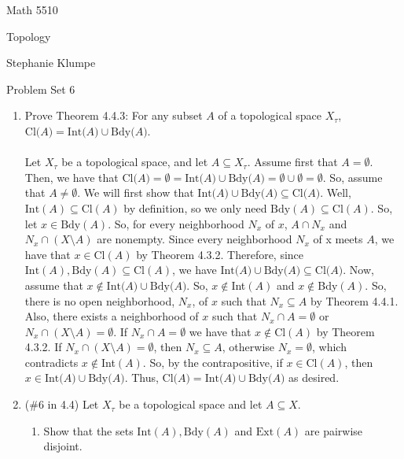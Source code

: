\documentclass[12pt]{article}
\begin{document}
\noindent Math 5510

\noindent Topology

\noindent Stephanie Klumpe

\vspace{.2in}
\begin{center}
Problem Set 6
\end{center}

 \begin{enumerate}%
\item Prove Theorem 4.4.3: For any subset $A$ of a topological space $X_{\tau}$,\\ $\text{Cl($A$)}=\text{Int($A$)}\cup\text{Bdy($A$)}$.\\\\

Let $X_{\tau}$ be a topological space, and let $A\subseteq X_{\tau}$. Assume first that $A=\emptyset$. Then, we have that $\text{Cl($A$)}=\emptyset=\text{Int($A$)}\cup\text{Bdy($A$)}=\emptyset\cup\emptyset=\emptyset$. So, assume that $A\neq\emptyset$. We will first show that $\text{Int($A$)}\cup\text{Bdy($A$)}\subseteq\text{Cl($A$)}$. Well, $\text{Int}(A)\subseteq\text{Cl}(A)$ by definition, so we only need $\text{Bdy}(A)\subseteq\text{Cl}(A)$. So, let $x\in\text{Bdy}(A)$. So, for every neighborhood $N_x$ of $x$, $A\cap N_x$ and $N_x\cap(X\setminus A)$ are nonempty. Since every neighborhood $N_x$ of x meets $A$, we have that $x\in\text{Cl}(A)$ by Theorem 4.3.2. Therefore, since $\text{Int}(A), \text{Bdy}(A)\subseteq\text{Cl}(A)$, we have $\text{Int($A$)}\cup\text{Bdy($A$)}\subseteq\text{Cl($A$)}$. Now, assume that $x\notin\text{Int($A$)}\cup\text{Bdy($A$)}$. So, $x\notin$Int$(A)$ and $x\notin$Bdy$(A)$. So, there is no open neighborhood, $N_x$, of $x$ such that $N_x\subseteq A$ by Theorem 4.4.1. Also, there exists a neighborhood of $x$ such that $N_x\cap A=\emptyset$ or $N_x\cap(X\setminus A)=\emptyset$. If $N_x\cap A=\emptyset$ we have that $x\notin$Cl$(A)$ by Theorem 4.3.2. If $N_x\cap(X\setminus A)=\emptyset$, then $N_x\subseteq A$, otherwise $N_x=\emptyset$, which contradicts $x\notin$Int$(A)$. So, by the contrapositive, if $x\in$Cl$(A)$, then $x\in\text{Int($A$)}\cup\text{Bdy($A$)}$. Thus, $\text{Cl($A$)}=\text{Int($A$)}\cup\text{Bdy($A$)}$ as desired.\\[20pt]

\item (\#6 in 4.4) Let $X_{\tau}$ be a topological space and let $A\subseteq X$.
\begin{enumerate}
\item Show that the sets $\text{Int}(A), \text{Bdy}(A)$ and $\text{Ext}(A)$ are pairwise disjoint.\\\\


\end{enumerate}
\end{enumerate}
\end{document}
